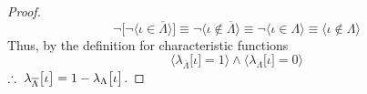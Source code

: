 \documentclass[preview]{standalone}
\begin{document}
\begin{proof}
\begin{equation*}
        \lnot \bigg[ \lnot \Big \langle \iota \in \overline{\Lambda} \Big \rangle \bigg]
            \equiv
        \lnot \Big \langle \iota \notin \overline{\Lambda} \Big \rangle
            \equiv
        \lnot \Big \langle \iota \in \Lambda \Big \rangle
            \equiv
        \Big \langle \iota \notin \Lambda \Big \rangle
    \end{equation*}
    Thus, by the definition for characteristic functions 
    \begin{equation*}
        \Big \langle 
            \lambda_{\overline{\Lambda}} \big[ \iota \big] = 1
        \Big \rangle
            \land
        \Big \langle 
            \lambda_{\Lambda} \big[ \iota \big] = 0
        \Big \rangle
    \end{equation*}
    $\therefore \text{\space} \relax{
        \lambda_{\overline{\Lambda}} \big[ \iota \big] 
            = 
        1 - \lambda_{\Lambda} \big[ \iota \big]
    }$.
\color{lightgray} \end{proof}
\end{document}
